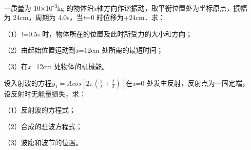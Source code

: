 \documentclass[fontset=exam]{exam-zh}
\begin{document}
\par{}\smallskip

一质量为 10×10\textsuperscript{-3}kg 的物体沿\emph{x}轴方向作谐振动，取平衡位置处为坐标原点，振幅为 24cm，周期为 4.0s，当\emph{t}=0 时位移为+24cm．求：

（1）\emph{t}=0.5s 时，物体所在的位置及此时所受力的大小和方向；

（2）由起始位置运动到\emph{x}=12cm 处所需的最短时间；

（3）在\emph{x}=12cm 处物体的机械能。


\par{}\smallskip

设入射波的方程\(y_{1} = Acos\left\lbrack {2\pi\left( {\frac{x}{\lambda} + \frac{t}{T}} \right)} \right\rbrack\)在\emph{x}=0 处发生反射，反射点为一固定端，设反射时无能量损失，求：

（1）反射波的方程式；

（2）合成的驻波方程式；

（3）波腹和波节的位置。
\end{document}
